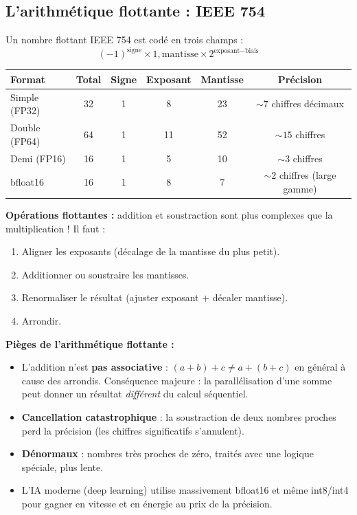 \documentclass[12pt,a4paper,twoside]{book}
\begin{document}
\subsection{L'arithmétique flottante : IEEE 754}

\begin{formule}
Un nombre flottant IEEE 754 est codé en trois champs :
\[
(-1)^{\text{signe}} \times 1{,}\text{mantisse} \times 2^{\text{exposant} - \text{biais}}
\]

\begin{center}
\renewcommand{\arraystretch}{1.3}
\begin{tabular}{lccccc}
\toprule
\textbf{Format} & \textbf{Total} & \textbf{Signe} & \textbf{Exposant} & \textbf{Mantisse} & \textbf{Précision} \\
\midrule
Simple (FP32) & 32 & 1 & 8 & 23 & $\sim 7$ chiffres décimaux \\
Double (FP64) & 64 & 1 & 11 & 52 & $\sim 15$ chiffres \\
Demi (FP16) & 16 & 1 & 5 & 10 & $\sim 3$ chiffres \\
bfloat16 & 16 & 1 & 8 & 7 & $\sim 2$ chiffres (large gamme) \\
\bottomrule
\end{tabular}
\end{center}

\textbf{Opérations flottantes :} addition et soustraction sont plus complexes que la multiplication ! Il faut :
\begin{enumerate}[nosep]
\item Aligner les exposants (décalage de la mantisse du plus petit).
\item Additionner ou soustraire les mantisses.
\item Renormaliser le résultat (ajuster exposant + décaler mantisse).
\item Arrondir.
\end{enumerate}
\end{formule}

\begin{attention}
\textbf{Pièges de l'arithmétique flottante :}
\begin{itemize}[nosep]
\item L'addition n'est \textbf{pas associative} : $(a+b)+c \neq a+(b+c)$ en général à cause des arrondis. Conséquence majeure : la parallélisation d'une somme peut donner un résultat \textit{différent} du calcul séquentiel.
\item \textbf{Cancellation catastrophique} : la soustraction de deux nombres proches perd la précision (les chiffres significatifs s'annulent).
\item \textbf{Dénormaux} : nombres très proches de zéro, traités avec une logique spéciale, plus lente.
\item L'IA moderne (deep learning) utilise massivement bfloat16 et même int8/int4 pour gagner en vitesse et en énergie au prix de la précision.
\end{itemize}
\end{attention}
\end{document}
